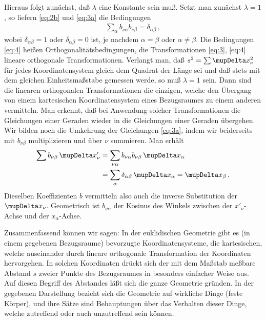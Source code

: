 Hieraus folgt zunächst, daß $\lambda$ eine Konstante sein muß. Setzt man 
zunächst $\lambda = 1$, so liefern \eqref{eq:2b} und \eqref{eq:3a} die
Bedingungen
\begin{align}
	\sum_{\alpha} b_{\nu \alpha} b_{\nu\beta} = \delta_{\alpha\beta}\,,
	\label{eq:4}
\end{align}
wobei $\delta_{\alpha\beta} = 1$ oder $\delta_{\alpha\beta} = 0$ ist, je 
nachdem $\alpha = \beta$ oder $\alpha \neq \beta$. Die Bedingungen 
\eqref{eq:4} heißen Orthogonalitätsbedingungen, die Transformationen 
\eqref{eq:3}, $\eqref{eq:4}$ lineare orthogonale Transformationen. Verlangt 
man, daß $s^2 = \sum \Dva x_{\nu}^2$ für jedes Koordinatensystem gleich dem 
Quadrat der Länge sei und daß stets mit dem gleichen Einheitsmaßstabe gemessen 
werde, so muß $\lambda = 1$ sein. Dann sind die linearen orthogonalen 
Transformationen die einzigen, welche den Übergang von einem kartesischen 
Koordinatensystem eines Bezugsraumes zu einem anderen vermitteln. Man erkennt, 
daß bei Anwendung solcher Transformationen die Gleichungen einer Geraden 
wieder in die Gleichungen einer Geraden übergehen. Wir bilden noch die 
Umkehrung der Gleichungen \eqref{eq:3a}, indem wir beiderseits mit 
$b_{\nu\beta}$ multiplizieren und über $\nu$ summieren. Man erhält
\begin{align}
\begin{aligned}
	\sum b_{\nu\beta}\, \Dva x'_{\nu} &= \sum_{\nu\alpha}
		b_{\nu\alpha} b_{\nu\beta} \,\Dva x_{\alpha}
		\\ 
		&= \sum_{\alpha}
		\delta_{\alpha\beta}\,\Dva x_{\alpha} = \Dva x_{\beta}\,.
\end{aligned}
	\label{eq:5}
\end{align}
Dieselben Koeffizienten $b$ vermitteln also auch die inverse Substitution der 
$\Dva x_{\nu}$. Geometrisch ist $b_{\nu\alpha}$ der Kosinus des Winkels 
zwischen der $x'_{\nu}$-Achse und der $x_{\alpha}$-Achse.

Zusammenfassend können wir sagen: In der euklidischen Geometrie gibt es (in 
einem gegebenen Bezugsraume) bevorzugte Koordinatensysteme, die kartesischen, 
welche auseinander durch lineare orthogonale Transformation der Koordinaten 
hervorgehen. In solchen Koordinaten drückt sich der mit dem Maßstab meßbare 
Abstand $s$ zweier Punkte des Bezugsraumes in besonders einfacher Weise aus. 
Auf diesen Begriff des Abstandes läßt sich die ganze Geometrie gründen. In der
gegebenen Darstellung bezieht sich die Geometrie auf wirkliche Dinge (feste 
Körper), und ihre Sätze sind Behauptungen über das Verhalten dieser Dinge, 
welche zutreffend oder auch unzutreffend sein können.

